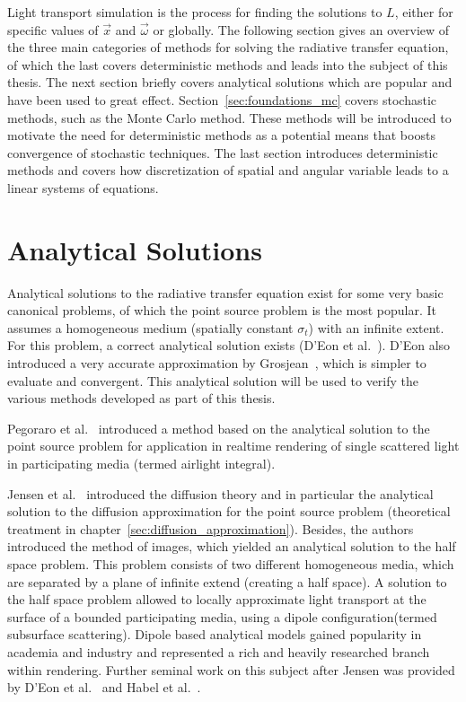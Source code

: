 Light transport simulation is the process for finding the solutions to $L$, either for specific values of $\vec{x}$ and $\vec{\omega}$ or globally. The following section gives an overview of the three main categories of methods for solving the radiative transfer equation, of which the last covers deterministic methods and leads into the subject of this thesis. The next section briefly covers analytical solutions which are popular and have been used to great effect. Section~\ref{sec:foundations_mc} covers stochastic methods, such as the Monte Carlo method. These methods will be introduced to motivate the need for deterministic methods as a potential means that boosts convergence of stochastic techniques. The last section introduces deterministic methods and covers how discretization of spatial and angular variable leads to a linear systems of equations.

\section{Analytical Solutions}
\label{sec:foundations_analytical}

Analytical solutions to the radiative transfer equation exist for some very basic canonical problems, of which the point source problem is the most popular. It assumes a homogeneous medium (spatially constant $\sigma_t$) with an infinite extent. For this problem, a correct analytical solution exists (D'Eon et al.~\cite{dEon11}). D'Eon also introduced a very accurate approximation by Grosjean~\cite{Grosjean56}, which is simpler to evaluate and convergent. This analytical solution will be used to verify the various methods developed as part of this thesis.

Pegoraro et al.~\cite{Pegoraro11} introduced a method based on the analytical solution to the point source problem for application in realtime rendering of single scattered light in participating media (termed airlight integral).

Jensen et al.~\cite{Jensen01} introduced the diffusion theory and in particular the analytical solution to the diffusion approximation for the point source problem (theoretical treatment in chapter~\ref{sec:diffusion_approximation}). Besides, the authors introduced the method of images, which yielded an analytical solution to the half space problem. This problem consists of two different homogeneous media, which are separated by a plane of infinite extend (creating a half space). A solution to the half space problem allowed to locally approximate light transport at the surface of a bounded participating media, using a dipole configuration(termed subsurface scattering). Dipole based analytical models gained popularity in academia and industry and represented a rich and heavily researched branch within rendering. Further seminal work on this subject after Jensen was provided by D'Eon et al.~\cite{dEon11} and Habel et al.~\cite{Habel13}.

